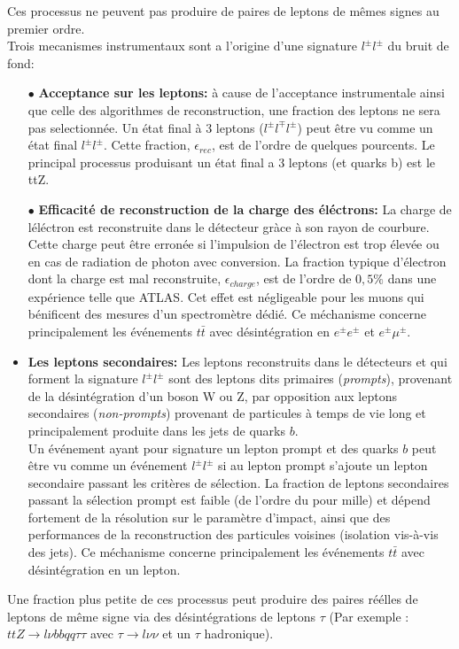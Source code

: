 Ces processus ne peuvent pas produire de paires de leptons de m\^emes signes au premier ordre. \\
Trois mecanismes instrumentaux sont a l'origine d'une signature $l^{\pm}l^{\pm}$ du bruit de fond:

\begin{itemize}
 \item[$\bullet$] {\bf Acceptance sur les leptons:} \`a cause de l'acceptance instrumentale ainsi que celle des algorithmes de reconstruction, une fraction des leptons ne sera pas selectionnée. Un état final à 3 leptons ($l^{\pm}l^{\mp}l^{\pm}$) peut \^etre vu comme un \'etat final $l^{\pm}l^{\pm}$. Cette fraction, $\epsilon_{rec}$, est de l'ordre de quelques pourcents.
Le principal processus produisant un \'etat final a 3 leptons (et quarks b) est le ttZ.\\

 \item[$\bullet$] {\bf Efficacit\'e de reconstruction de la charge des \'el\'ectrons:} La charge de l\'el\'ectron est reconstruite dans le d\'etecteur gr\`ace \`a son rayon de courbure. Cette charge peut \^etre erron\'ee si l'impulsion de l'\'electron est trop \'elev\'ee ou en cas de radiation de photon avec conversion. La fraction typique d'\'electron dont la charge est mal reconstruite, $\epsilon_{charge}$, est de l'ordre de $0,5\%$ dans une exp\'erience telle que ATLAS. Cet effet est n\'egligeable pour les muons qui b\'enificent des mesures d'un spectrom\`etre d\'edi\'e.
Ce m\'echanisme concerne principalement les \'ev\'enements $t\bar{t}$ avec d\'esint\'egration en $e^{\pm}e^{\pm}$ et $e^{\pm}\mu^{\pm}$. \\
\item {\bf Les leptons secondaires:} Les leptons reconstruits dans le d\'etecteurs et qui forment la signature $l^{\pm}l^{\pm}$ sont des leptons dits primaires ({\it prompts}), provenant de la d\'esint\'egration d'un boson W ou Z, par opposition aux leptons secondaires ({\it non-prompts}) provenant de particules \`a temps de vie long et principalement produite dans les jets de quarks $b$.\\ 
 Un \'ev\'enement ayant pour signature un lepton prompt et des quarks $b$ peut \^etre vu comme un \'ev\'enement $l^{\pm}l^{\pm}$ si au lepton prompt s'ajoute un lepton secondaire passant les crit\`eres de s\'election. La fraction de leptons secondaires passant la s\'election prompt est faible (de l'ordre du pour mille) et d\'epend fortement de la r\'esolution sur le param\`etre d'impact, ainsi que des performances de la reconstruction des particules voisines (isolation vis-\`a-vis des jets). Ce m\'echanisme concerne principalement les \'ev\'enements $t\bar{t}$ avec d\'esint\'egration en un lepton. \\
\end{itemize}
Une fraction plus petite de ces processus peut produire des paires r\'e\'elles de leptons de m\^eme signe via des d\'esint\'egrations de leptons $\tau$ (Par exemple : $ttZ \rightarrow l \nu bbqq \tau \tau$ avec $\tau \rightarrow l\nu\nu$ et un $\tau$ hadronique).

